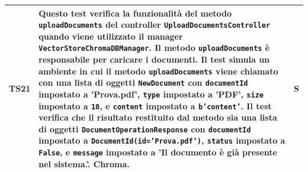 \documentclass[10pt, a4paper]{article}
\begin{document}
\begin{xltabular}{\textwidth}{p{0.12\textwidth}|X|p{0.12\textwidth}}
    \hline
    TS21 & Questo test verifica la funzionalità del metodo \texttt{uploadDocuments} del controller \texttt{UploadDocumentsController} quando viene utilizzato il manager \texttt{VectorStoreChromaDBManager}. Il metodo \texttt{uploadDocuments} è responsabile per caricare i documenti. Il test simula un ambiente in cui il metodo \texttt{uploadDocuments} viene chiamato con una lista di oggetti \texttt{NewDocument} con \texttt{documentId} impostato a 'Prova.pdf', \texttt{type} impostato a 'PDF', \texttt{size} impostato a \texttt{10}, e \texttt{content} impostato a \texttt{b'content'}. Il test verifica che il risultato restituito dal metodo sia una lista di oggetti \texttt{DocumentOperationResponse} con \texttt{documentId} impostato a \texttt{DocumentId(id='Prova.pdf')}, \texttt{status} impostato a \texttt{False}, e \texttt{message} impostato a 'Il documento è già presente nel sistema.'. Chroma.  & S \\
    \hline
\end{xltabular}



    
\end{document}
